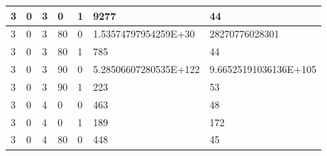 \documentclass{article}
\theoremstyle{definition}
\begin{document}
\begin{table}[]
\begin{tabular}{|l|l|l|l|l|l|l|}
3                                      & 0                                       & 3                                      & 0                                    & 1                                      & 9277                                     & 44                                     \\ \hline
3                                      & 0                                       & 3                                      & 80                                   & 0                                      & 1.53574797954259E+30                     & 28270776028301                         \\ \hline
3                                      & 0                                       & 3                                      & 80                                   & 1                                      & 785                                      & 44                                     \\ \hline
3                                      & 0                                       & 3                                      & 90                                   & 0                                      & 5.28506607280535E+122                    & 9.66525191036136E+105                  \\ \hline
3                                      & 0                                       & 3                                      & 90                                   & 1                                      & 223                                      & 53                                     \\ \hline
3                                      & 0                                       & 4                                      & 0                                    & 0                                      & 463                                      & 48                                     \\ \hline
3                                      & 0                                       & 4                                      & 0                                    & 1                                      & 189                                      & 172                                    \\ \hline
3                                      & 0                                       & 4                                      & 80                                   & 0                                      & 448                                      & 45                                     \\ \hline

\end{tabular}
\end{table}
\end{document}

